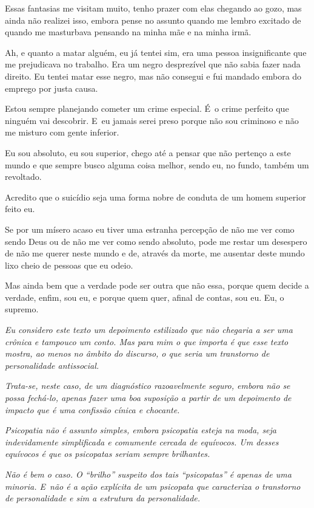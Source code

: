 Essas fantasias me visitam muito, tenho prazer com elas chegando ao
gozo, mas ainda não realizei isso, embora pense no assunto quando me
lembro excitado de quando me masturbava pensando na minha mãe e na minha irmã.

Ah, e quanto a matar alguém, eu já tentei sim, era uma pessoa
insignificante que me prejudicava no trabalho. Era um negro desprezível
que não sabia fazer nada direito. Eu tentei matar esse negro, mas não
consegui e fui mandado embora do emprego por justa causa.

Estou sempre planejando cometer um crime especial. É~o crime perfeito
que ninguém vai descobrir. E~eu jamais serei preso porque não sou
criminoso e não me misturo com gente inferior.

Eu sou absoluto, eu sou superior, chego até a pensar que não pertenço a
este mundo e que sempre busco alguma coisa melhor, sendo eu, no fundo,
também um revoltado.

Acredito que o suicídio seja uma forma nobre de conduta de um homem
superior feito eu.

Se por um mísero acaso eu tiver uma estranha percepção de não me ver
como sendo Deus ou de não me ver como sendo absoluto, pode me restar um
desespero de não me querer neste mundo e de, através da morte, me
ausentar deste mundo lixo cheio de pessoas que eu odeio.

Mas ainda bem que a verdade pode ser outra que não essa, porque quem
decide a verdade, enfim, sou eu, e porque quem quer, afinal de contas,
sou eu. Eu, o supremo.

\begin{center}\asterisc{}\end{center}
\begingroup\small

\emph{Eu considero este texto um depoimento estilizado que não chegaria
a ser uma crônica e tampouco um conto. Mas para mim o que importa é que
esse texto mostra, ao menos no âmbito do discurso, o que seria um
transtorno de personalidade antissocial.}

\emph{Trata-se, neste caso, de um diagnóstico razoavelmente seguro,
embora não se possa fechá-lo, apenas fazer uma boa suposição a partir de
um depoimento de impacto que é uma confissão cínica e chocante.}

\emph{Psicopatia não é assunto simples, embora psicopatia esteja na
moda, seja indevidamente simplificada e comumente cercada de equívocos.
Um desses equívocos é que os psicopatas seriam sempre brilhantes.}

\emph{Não é bem o caso. O ``brilho'' suspeito dos tais ``psicopatas'' é
apenas de uma minoria. E~não é a ação explícita de um psicopata que
caracteriza o transtorno de personalidade e sim a estrutura da
personalidade.}


